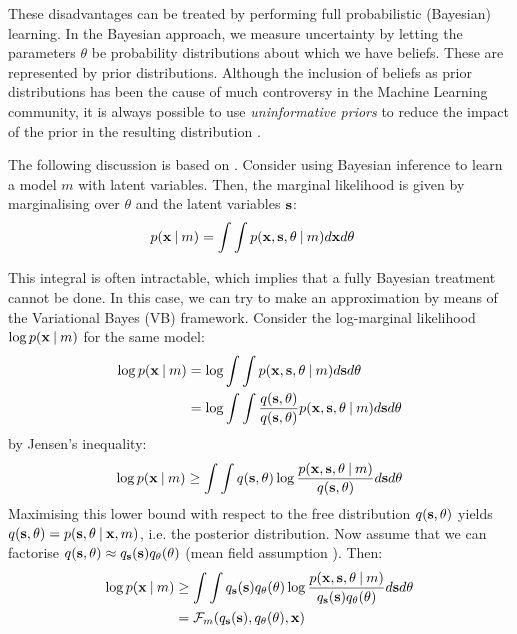 \documentclass[../main.tex]{subfiles}
\begin{document}
\par These disadvantages can be treated by performing full probabilistic (Bayesian) learning. In the Bayesian approach, we measure uncertainty by letting the parameters $\theta$ be probability distributions about which we have beliefs. These are represented by prior distributions. Although the inclusion of beliefs as prior distributions has been the cause of much controversy in the Machine Learning community, it is always possible to use \emph{uninformative priors} to reduce the impact of the prior in the resulting distribution \cite{Bishop2006}. 
\par The following discussion is based on \cite{Ghahramani2001,Beal2003}. Consider using Bayesian inference to learn a model $m$ with latent variables. Then, the marginal likelihood is given by marginalising over $\theta$ and the latent variables $\mathbf{s}$:
\begin{align*}
p(\mathbf{x} \:\vert\: m) &= \int\int p(\mathbf{x}, \mathbf{s}, \theta \:\vert\: m) d\mathbf{x} d\theta
\end{align*}
\par This integral is often intractable, which implies that a fully Bayesian treatment cannot be done. In this case, we can try to make an approximation by means of the Variational Bayes (VB) framework. Consider the log-marginal likelihood $\log{p(\mathbf{x} \:\vert\: m)}$ for the same model:
\begin{align*}\label{eq:marginal}
\log{p(\mathbf{x} \:\vert\: m)} &= \log{\int\int p(\mathbf{x}, \mathbf{s}, \theta \:\vert\: m) d\mathbf{s} d\theta}\\
&= \log{\int\int \frac{q(\mathbf{s}, \theta)}{q(\mathbf{s}, \theta)}p(\mathbf{x}, \mathbf{s}, \theta \:\vert\: m) d\mathbf{s} d\theta}
\end{align*}
by Jensen's inequality:
\begin{equation*}\label{eq:jensen}
\log{p(\mathbf{x} \:\vert\: m)} \geq  \int\int q(\mathbf{s}, \theta)\log{\frac{p(\mathbf{x}, \mathbf{s}, \theta \:\vert\: m)}{q(\mathbf{s}, \theta)}} d\mathbf{s} d\theta
\end{equation*}
Maximising this lower bound with respect to the free distribution $q(\mathbf{s}, \theta)$ yields $q(\mathbf{s}, \theta) = p(\mathbf{s}, \theta \:\vert\: \mathbf{x}, m)$, i.e. the posterior distribution. Now assume that we can factorise $q(\mathbf{s}, \theta) \approx q_{\mathbf{s}}(\mathbf{s})q_{\theta}(\theta)$ (mean field assumption \cite{Rezek2005}). Then:
\begin{align*}
\log{p(\mathbf{x} \:\vert\: m)} &\geq  \int\int q_{\mathbf{s}}(\mathbf{s})q_{\theta}(\theta)\log{\frac{p(\mathbf{x}, \mathbf{s}, \theta \:\vert\: m)}{q_{\mathbf{s}}(\mathbf{s})q_{\theta}(\theta)}} d\mathbf{s} d\theta \\
 &= \mathcal{F}_m(q_{\mathbf{s}}(\mathbf{s}), q_{\theta}(\theta), \mathbf{x})
\end{align*}
\end{document}
